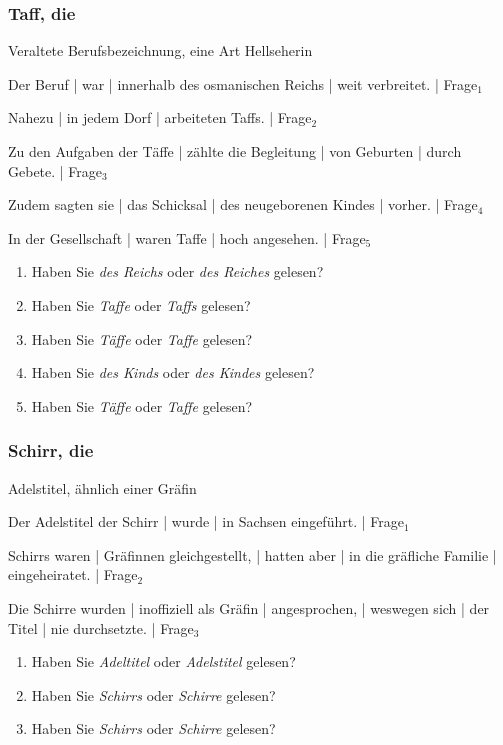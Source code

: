 \subsubsection*{Taff, die}
Veraltete Berufsbezeichnung, eine Art Hellseherin
\begin{SchmittAppendixList}
\item Der Beruf | war | innerhalb des osmanischen Reichs | weit verbreitet. | Frage$_1$ 
\item Nahezu | in jedem Dorf | arbeiteten Taffs. | Frage$_2$ 
\item Zu den Aufgaben der Täffe | zählte die Begleitung | von Geburten | durch Gebete. | Frage$_3$     
\item Zudem sagten sie | das Schicksal | des neugeborenen Kindes | vorher. | Frage$_4$ 
\item In der Gesellschaft |  waren Taffe |  hoch angesehen. | Frage$_5$ 
\end{SchmittAppendixList}

\begin{enumerate}
\item Haben Sie \textit{des Reichs} oder \textit{des Reiches} gelesen?   
\item Haben Sie \textit{Taffe} oder \textit{Taffs} gelesen?   
\item Haben Sie \textit{Täffe} oder \textit{Taffe} gelesen?  
\item Haben Sie \textit{des Kinds} oder \textit{des Kindes} gelesen?   
\item Haben Sie \textit{Täffe} oder \textit{Taffe} gelesen?   
\end{enumerate}


\subsubsection*{Schirr, die}
Adelstitel, ähnlich einer Gräfin
\begin{SchmittAppendixList}
\item Der Adelstitel der Schirr | wurde | in Sachsen eingeführt. | Frage$_1$ 
\item Schirrs waren | Gräfinnen gleichgestellt, | hatten aber | in die gräfliche Familie | eingeheiratet. | Frage$_2$ 
\item Die Schirre wurden | inoffiziell als Gräfin | angesprochen, | weswegen sich | der Titel | nie durchsetzte. | Frage$_3$
\end{SchmittAppendixList}

\begin{enumerate}
\item Haben Sie \textit{Adeltitel} oder \textit{Adelstitel} gelesen?
\item Haben Sie \textit{Schirrs} oder \textit{Schirre} gelesen?
\item Haben Sie \textit{Schirrs} oder \textit{Schirre} gelesen?
\end{enumerate}

